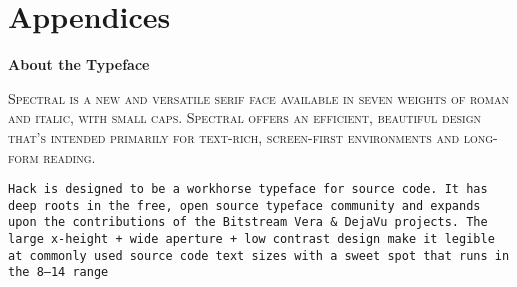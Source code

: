 \setcounter{footnote}{0}
\setcounter{section}{1}



\mainmatter
\renewcommand{\thefootnote}{\arabic{footnote}}











\part*{Appendices}
\appendix


\newpage
\backmatter

\titleformat{\chapter}[hang]{\Large}{\filright\enspace\thechapter\enspace}{2.5cm}{\Large\bfseries\filcenter}
\printbibliography

\newpage
{}
\vspace*{0.075\paperheight}
\begin{center}\bfseries
About the Typeface
\end{center}
\noindent\hfil\parbox[c][1.1\height][c]{0.6\textwidth}{\small\textsc{%
Spectral is a new and versatile serif face available in seven weights of roman and italic, with small caps.
Spectral offers an efficient, beautiful design that’s intended primarily for text-rich, screen-first environments and long-form reading.}

\vspace*{1.5\baselineskip}

\texttt{Hack is designed to be a workhorse typeface for source code.
It has deep roots in the free, open source typeface community and expands upon the contributions of the Bitstream Vera \& DejaVu projects.
The large x-height + wide aperture + low contrast design make it legible at commonly used source code text sizes with a sweet spot that runs in the 8--14 range}}

